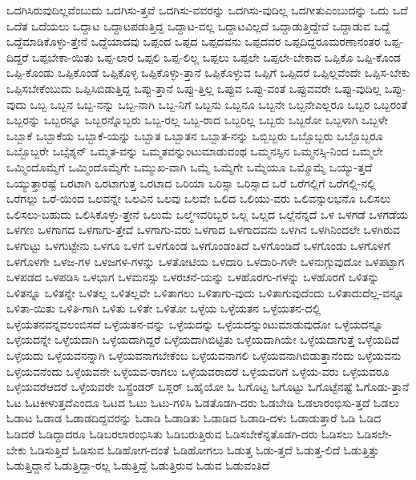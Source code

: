 {ಒದಗಿಸಿರುವುದಿಲ್ಲವೆಂಬುದು
ಒದಗಿಸು-ತ್ತವೆ
ಒದಗಿಸು-ವವರನ್ನು
ಒದಗಿಸು-ವುದಿಲ್ಲ
ಒದಗೀತುಎಂಬುದನ್ನು
ಒದು
ಒದೆ
ಒದೆತ
ಒದೆಯಲು
ಒದ್ದಾಟ
ಒದ್ದಾಟಪಡುತ್ತಿದ್ದ
ಒದ್ದಾಟ-ವಲ್ಲ
ಒದ್ದಾಟವಿಲ್ಲದೆ
ಒದ್ದಾಡುತ್ತಿದ್ದೇವೆ
ಒದ್ದಾಡುವ
ಒದ್ದೆ
ಒದ್ದೆಮಾಡಿಕೊಳ್ಳು-ತ್ತೇನೆ
ಒದ್ದೆಯಾದವು
ಒಪ್ಪಂದ
ಒಪ್ಪದ
ಒಪ್ಪದವನು
ಒಪ್ಪದವರ
ಒಪ್ಪದಿದ್ದರೂಮರಣಾನಂತರ
ಒಪ್ಪ-ದಿದ್ದರೆ
ಒಪ್ಪಬೇಕಾ-ಯಿತು
ಒಪ್ಪ-ಲಾರ
ಒಪ್ಪಲಿ
ಒಪ್ಪ-ಲಿಲ್ಲ
ಒಪ್ಪಲು
ಒಪ್ಪಲೇ
ಒಪ್ಪಲೇ-ಬೇಕಾದ
ಒಪ್ಪಿಕೊ
ಒಪ್ಪಿ-ಕೊಂಡ
ಒಪ್ಪಿ-ಕೊಂಡು
ಒಪ್ಪಿಕೊಂಡೆ
ಒಪ್ಪಿಕೊಳ್ಳ
ಒಪ್ಪಿಕೊಳ್ಳು-ತ್ತಾನೆ
ಒಪ್ಪಿಕೊಳ್ಳುವ
ಒಪ್ಪಿಗೆ
ಒಪ್ಪಿದರೆ
ಒಪ್ಪಿಲ್ಲವೆಂದೇ
ಒಪ್ಪಿಸ-ಬೇಕು
ಒಪ್ಪಿಸಬೇಕೆಂಬುದು
ಒಪ್ಪಿಸಿಬಿಡುತ್ತಿದ್ದ
ಒಪ್ಪು-ತ್ತಾನೆ
ಒಪ್ಪು-ತ್ತಿಲ್ಲ
ಒಪ್ಪುವ
ಒಪ್ಪು-ವಂತೆ
ಒಪ್ಪುವವರೇ
ಒಪ್ಪು-ವುದಿಲ್ಲ
ಒಪ್ಪು-ವುದು
ಒಬ್ಬ
ಒಬ್ಬನ
ಒಬ್ಬ-ನನ್ನು
ಒಬ್ಬ-ನಾಗಿ
ಒಬ್ಬ-ನಿಗೆ
ಒಬ್ಬನು
ಒಬ್ಬನೂ
ಒಬ್ಬನೇ
ಒಬ್ಬನೇಎಲ್ಲರೂ
ಒಬ್ಬರ
ಒಬ್ಬರಂತೆ
ಒಬ್ಬರನ್ನು
ಒಬ್ಬರನ್ನೂ
ಒಬ್ಬರನ್ನೊಬ್ಬರು
ಒಬ್ಬ-ರಲ್ಲ
ಒಬ್ಬ-ರಾದ
ಒಬ್ಬರಿಲ್ಲ
ಒಬ್ಬರು
ಒಬ್ಬರೋ
ಒಬ್ಬಳಾಗಿ
ಒಬ್ಬಳೇ
ಒಬ್ಬಾಕೆ
ಒಬ್ಬಾಕೆಯ
ಒಬ್ಬಾಕೆ-ಯನ್ನು
ಒಬ್ಬಾತ
ಒಬ್ಬಾತನ
ಒಬ್ಬಾತ-ನನ್ನು
ಒಬ್ಬಿಬ್ಬರು
ಒಬ್ಬೊಬ್ಬರು
ಒಬ್ಬೊಬ್ಬರೂ
ಒಬ್ಬೊಬ್ಬರೇ
ಒಬ್ಸೆಶ್ಶನ್
ಒಮ್ಮತ-ವನ್ನು
ಒಮ್ಮತವನ್ನುಂಟುಮಾಡುವಂಥ
ಒಮ್ಮನಸ್ಸಿನ
ಒಮ್ಮನಸ್ಸಿ-ನಿಂದ
ಒಮ್ಮಲೇ
ಒಮ್ಮಿಂದೊಮ್ಮೆಗೆ
ಒಮ್ಮಿಂದೊಮ್ಮೆಗೇ
ಒಮ್ಮುಖ-ವಾಗಿ
ಒಮ್ಮೆ
ಒಮ್ಮೆಗೇ
ಒಮ್ಮೆಯೂ
ಒಮ್ಮೊಮ್ಮೆ
ಒಯ್ಯು-ತ್ತದೆ
ಒಯ್ಯುತ್ತಾರಷ್ಟೆ
ಒರಟಾಗಿ
ಒರಟಾಗುತ್ತ
ಒರಟಾದ
ಒರಿಯಾ
ಒರಿಸ್ಸಾ
ಒರಿಸ್ಸಾದ
ಒರೆ
ಒರೆಗಲ್ಲಿಗೆ
ಒರೆಗಲ್ಲಿ-ನಲ್ಲಿ
ಒರೆಗಲ್ಲು
ಒರೆ-ಯಿಂದ
ಒಲವನ್ನೇ
ಒಲವಿನ
ಒಲವು
ಒಲವೇ
ಒಲಿದ
ಒಲಿಯು-ವರು
ಒಲಿವನ್ಸುಲಭನೊ
ಒಲಿಸಲು
ಒಲಿಸಲು-ಬಹುದು
ಒಲಿಸಿಕೊಳ್ಳು-ತ್ತೇನೆ
ಒಲುಮೆ
ಒಲ್ಮೆಇವರಿಬ್ಬರ
ಒಲ್ಲ
ಒಲ್ಲದ
ಒಲ್ಲೆನೆನ್ನದೆ
ಒಳ
ಒಳಗಡೆ
ಒಳಗಡೆಯ
ಒಳಗಣ
ಒಳಗಾಗದ
ಒಳಗಾಗು-ತ್ತೇವೆ
ಒಳಗಾಗು-ವರು
ಒಳಗಾದ
ಒಳಗಾದವನು
ಒಳಗಿನ
ಒಳಗಿನಿಂದಲೇ
ಒಳಗಿರುವ
ಒಳಗುಟ್ಟು
ಒಳಗುಟ್ಟೇನು
ಒಳಗೂ
ಒಳಗೆ
ಒಳಗೊಂಡ
ಒಳಗೊಂಡಂತಿದೆ
ಒಳಗೊಂಡಿದೆ
ಒಳಗೊಂಡು
ಒಳಗೊಳಗೆ
ಒಳಗೊಳಗೇ
ಒಳಜ-ಗಳ
ಒಳಜಗಳ-ಗಳನ್ನು
ಒಳತೋಟಿಯ
ಒಳದಾರಿ
ಒಳದಾರಿ-ಗಳೇ
ಒಳನುಗ್ಗುವುದೋ
ಒಳಪಟ್ಟಾಗ
ಒಳಪಡದ
ಒಳಪಡಿಸಿ
ಒಳಭಾಗ
ಒಳಮನಸ್ಸು
ಒಳರಚನೆ-ಯನ್ನು
ಒಳಹೊರಗು-ಗಳನ್ನು
ಒಳಹೊರಗೆ
ಒಳಿತನ್ನು
ಒಳಿತನ್ನೂ
ಒಳಿತನ್ನೇ
ಒಳಿತಲ್ಲ
ಒಳಿತಲ್ಲವೇ
ಒಳಿತಾಗಲು
ಒಳಿತಾಗು-ವುದು
ಒಳಿತಾಗುವುದೆಂದು
ಒಳಿತಾದುದೆಲ್ಲ-ವನ್ನೂ
ಒಳಿತಾ-ಯಿತು
ಒಳಿತಿ-ಗಾಗಿ
ಒಳಿತು
ಒಳಿತೇ
ಒಳಿತೋ
ಒಳ್ಳೆಯ
ಒಳ್ಳೆಯತನ
ಒಳ್ಳೆಯತನ-ದಲ್ಲಿ
ಒಳ್ಳೆಯತನವನ್ನವಲಂಬಿಸದೆ
ಒಳ್ಳೆಯತನ-ವನ್ನು
ಒಳ್ಳೆಯದನ್ನು
ಒಳ್ಳೆಯದನ್ನುಂಟುಮಾಡುವುದೋ
ಒಳ್ಳೆಯದನ್ನೂ
ಒಳ್ಳೆಯದನ್ನೇ
ಒಳ್ಳೆಯದಾಗಿ
ಒಳ್ಳೆಯದಾಗಿದ್ದರೆ
ಒಳ್ಳೆಯದಾಗಿಬಿಟ್ಟಿತು
ಒಳ್ಳೆಯದಾಗಿಯೇ
ಒಳ್ಳೆಯದಾಗುತ್ತೆ
ಒಳ್ಳೆಯದಿದೆ
ಒಳ್ಳೆಯದು
ಒಳ್ಳೆಯವನನ್ನಾಗಿ
ಒಳ್ಳೆಯವನಾಗಬೇಕೆಂಬ
ಒಳ್ಳೆಯವನಾಗಲಿ
ಒಳ್ಳೆಯವನಾಗಿಬಿಡುತ್ತಾನೆಂದು
ಒಳ್ಳೆಯವನು
ಒಳ್ಳೆಯವನೆಂದು
ಒಳ್ಳೆಯವನೇ
ಒಳ್ಳೆಯವ-ರಾಗಲು
ಒಳ್ಳೆಯವರಾದರೆ
ಒಳ್ಳೆಯವರಿಗೆ
ಒಳ್ಳೆಯ-ವರು
ಒಳ್ಳೆಯವರೂ
ಒಳ್ಳೆಯವರೆಆದರೆ
ಒಳ್ಳೆಯವರೇ
ಒಸ್ಟ್ರೆಂಡರ್
ಒಸ್ಲರ್
ಒಹೈಯೋ
ಓ
ಓಗೊಟ್ಟ
ಓಗೊಟ್ಟು
ಓಗೊಟ್ಟೆನಷ್ಟೆ
ಓಗೊಡು-ತ್ತಾನೆ
ಓಟ
ಓಟಕೀಳುತ್ತದೆಎಂದೂ
ಓಟದ
ಓಟು
ಓಟು-ಗಳಿಸಿ
ಓಡತೊಡಗಿ-ದರು
ಓಡಬೇಡಿ
ಓಡಲಾರಂಭಿಸು-ತ್ತದೆ
ಓಡಲು
ಓಡಾಟ
ಓಡಾಡ
ಓಡಾಡದಿದ್ದವರನ್ನು
ಓಡಾಡಿ
ಓಡಾಡಿತು
ಓಡಾಡಿದ
ಓಡಾಡಿ-ದಳು
ಓಡಾಡುತ್ತಾರೆ
ಓಡಿ
ಓಡಿದ
ಓಡಿದರೆ
ಓಡಿದ್ದಾದರೂ
ಓಡಿಬರಲಾರಂಭಿಸಿತು
ಓಡಿಬರುತ್ತಿರುವ
ಓಡಿಸಬೇಕೆನ್ನತೊಡಗಿ-ದರು
ಓಡಿಸಲು
ಓಡಿಸಲೇ-ಬೇಕು
ಓಡಿಸುತ್ತಿದೆ
ಓಡಿಸುವ
ಓಡಿಹೋಗ-ದಂತೆ
ಓಡಿಹೋಗಲು
ಓಡುತ್ತ
ಓಡು-ತ್ತದೆ
ಓಡುತ್ತ-ಲಿದೆ
ಓಡುತ್ತಿತ್ತು
ಓಡುತ್ತಿದ್ದಾನೆ
ಓಡುತ್ತಿದ್ದಾ-ರಲ್ಲ
ಓಡುತ್ತಿದ್ದೆ
ಓಡುತ್ತಿರುವ
ಓಡುವ
ಓಡುವಂತಿದೆ
}
